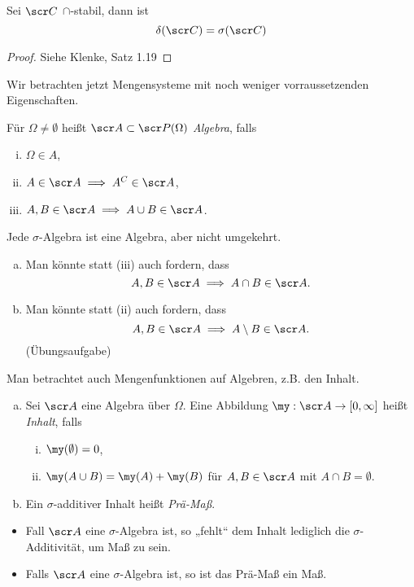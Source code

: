 \begin{st} \label{1.3.3}
	Sei $\scr C$ $\cap$-stabil, dann ist
	\[
		\delta(\scr C) = \sigma(\scr C)
	\]
	\begin{proof}
		Siehe Klenke, Satz 1.19
	\end{proof}
\end{st}

Wir betrachten jetzt Mengensysteme mit noch weniger vorraussetzenden Eigenschaften.

\begin{df} \label{1.3.4}
	Für $\Omega \neq \emptyset$ heißt $\scr A \subset \scr P(\Omega)$ \emph{Algebra}, falls
	\begin{enumerate}[(i)]
		\item
			$\Omega \in A$,
		\item
			$A \in \scr A \implies A^C \in \scr A$,
		\item
			$A,B \in \scr A \implies A \cup B \in \scr A$.
	\end{enumerate}
\end{df}

\begin{nt} \label{1.3.5}
	Jede $\sigma$-Algebra ist eine Algebra, aber nicht umgekehrt.
	\begin{enumerate}[(a)]
		\item
			Man könnte statt (iii) auch fordern, dass
			\[
				A,B \in \scr A \implies A \cap B \in \scr A.
			\]
		\item
			Man könnte statt (ii) auch fordern, dass
			\[
				A,B \in \scr A \implies A \setminus B \in \scr A.
			\]
			(Übungsaufgabe)
	\end{enumerate}
\end{nt}

Man betrachtet auch Mengenfunktionen auf Algebren, z.B. den Inhalt.

\begin{df} \label{1.3.6}
	\begin{enumerate}[(a)]
		\item
			Sei $\scr A$ eine Algebra über $\Omega$.
			Eine Abbildung $\my: \scr A \to [0,\infty]$ heißt \emph{Inhalt}, falls
			\begin{enumerate}[(i)]
				\item
					$\my(\emptyset) = 0$,
				\item
					$\my(A \cup B) = \my(A) + \my(B)$ für $A,B \in \scr A$ mit $A \cap B = \emptyset$.
			\end{enumerate}
		\item
			Ein $\sigma$-additiver Inhalt heißt \emph{Prä-Maß}.
	\end{enumerate}
	\begin{nt*}
		\begin{itemize}
			\item
				Fall $\scr A$ eine $\sigma$-Algebra ist, so „fehlt“ dem Inhalt lediglich die $\sigma$-Additivität, um Maß zu sein.
			\item
				Falls $\scr A$ eine $\sigma$-Algebra ist, so ist das Prä-Maß ein Maß.
		\end{itemize}
	\end{nt*}
\end{df}

